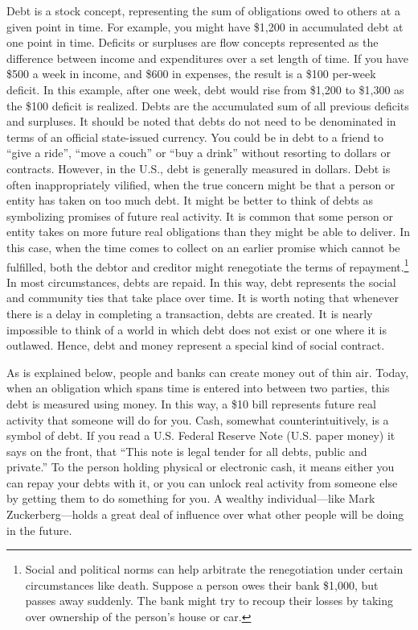 \documentclass[
]{book}
\begin{document}
Debt is a stock concept, representing the sum of obligations owed to others at a given point in time. For example, you might have \$1,200 in accumulated debt at one point in time. Deficits or surpluses are flow concepts represented as the difference between income and expenditures over a set length of time. If you have \$500 a week in income, and \$600 in expenses, the result is a \$100 per-week deficit. In this example, after one week, debt would rise from \$1,200 to \$1,300 as the \$100 deficit is realized. Debts are the accumulated sum of all previous deficits and surpluses. It should be noted that debts do not need to be denominated in terms of an official state-issued currency. You could be in debt to a friend to ``give a ride'', ``move a couch'' or ``buy a drink'' without resorting to dollars or contracts. However, in the U.S., debt is generally measured in dollars. Debt is often inappropriately vilified, when the true concern might be that a person or entity has taken on too much debt. It might be better to think of debts as symbolizing promises of future real activity. It is common that some person or entity takes on more future real obligations than they might be able to deliver. In this case, when the time comes to collect on an earlier promise which cannot be fulfilled, both the debtor and creditor might renegotiate the terms of repayment.\footnote{Social and political norms can help arbitrate the renegotiation under certain circumstances like death. Suppose a person owes their bank \$1,000, but passes away suddenly. The bank might try to recoup their losses by taking over ownership of the person's house or car.} In most circumstances, debts are repaid. In this way, debt represents the social and community ties that take place over time. It is worth noting that whenever there is a delay in completing a transaction, debts are created. It is nearly impossible to think of a world in which debt does not exist or one where it is outlawed. Hence, debt and money represent a special kind of social contract.

As is explained below, people and banks can create money out of thin air. Today, when an obligation which spans time is entered into between two parties, this debt is measured using money. In this way, a \$10 bill represents future real activity that someone will do for you. Cash, somewhat counterintuitively, is a symbol of debt. If you read a U.S. Federal Reserve Note (U.S. paper money) it says on the front, that ``This note is legal tender for all debts, public and private.'' To the person holding physical or electronic cash, it means either you can repay your debts with it, or you can unlock real activity from someone else by getting them to do something for you. A wealthy individual---like Mark Zuckerberg---holds a great deal of influence over what other people will be doing in the future.
\end{document}
